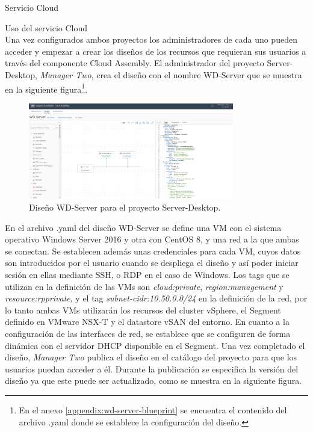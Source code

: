 \begin{subsection}{Servicio Cloud}
\begin{subsubsection}{Uso del servicio Cloud}
        \\
        Una vez configurados ambos proyectos los administradores de cada uno pueden acceder y empezar a crear los diseños de los recursos que requieran sus usuarios a través del componente Cloud Assembly. El administrador del proyecto Server-Desktop, \textit{Manager Two}, crea el diseño con el nombre WD-Server que se muestra en la siguiente figura\footnote{En el anexo \ref{appendix:wd-server-blueprint} se encuentra el contenido del archivo .yaml donde se establece la configuración del diseño.}.
        \begin{figure}[h]
            \centering
            \includegraphics[width=0.8\textwidth]{imaxes/pruebaconcepto/vrealize/windows-centos-blueprint.png}
            \caption{Diseño WD-Server para el proyecto Server-Desktop.}
            \label{fig:server-desktop-blueprint}
        \end{figure}
        \FloatBarrier
        En el archivo .yaml del diseño WD-Server se define una VM con el sistema operativo Windows Server 2016 y otra con CentOS 8, y una red a la que ambas se conectan. Se establecen además unas credenciales para cada VM, cuyos datos son introducidos por el usuario cuando se despliega el diseño y así poder iniciar sesión en ellas mediante SSH, o RDP en el caso de Windows. Los tags que se utilizan en la definición de las VMs son \textit{cloud:private}, \textit{region:management} y \textit{resource:rpprivate}, y el tag \textit{subnet-cidr:10.50.0.0/24} en la definición de la red, por lo tanto ambas VMs utilizarán los recursos del cluster vSphere, el Segment definido en VMware NSX-T y el datastore vSAN del entorno. En cuanto a la configuración de las interfaces de red, se establece que se configuren de forma dinámica con el servidor DHCP disponible en el Segment. Una vez completado el diseño, \textit{Manager Two} publica el diseño en el catálogo del proyecto para que los usuarios puedan acceder a él. Durante la publicación se especifica la versión del diseño ya que este puede ser actualizado, como se muestra en la siguiente figura.

\end{subsubsection}
\end{subsection}
